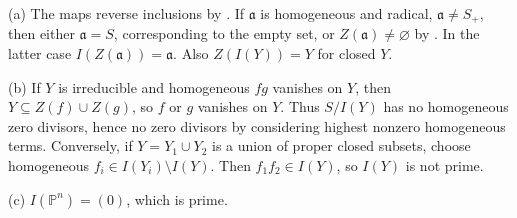 (a) The maps reverse inclusions by . If $\mathfrak a$ is homogeneous and radical, $\mathfrak a\ne S_+$, then either $\mathfrak a=S$, corresponding to the empty set, or $Z(\mathfrak a)\ne\varnothing$ by . In the latter case $I(Z(\mathfrak a))=\mathfrak a$. Also $Z(I(Y))=Y$ for closed $Y$.

(b) If $Y$ is irreducible and homogeneous $fg$ vanishes on $Y$, then $Y\subseteq Z(f)\cup Z(g)$, so $f$ or $g$ vanishes on $Y$. Thus $S/I(Y)$ has no homogeneous zero divisors, hence no zero divisors by considering highest nonzero homogeneous terms. Conversely, if $Y=Y_1\cup Y_2$ is a union of proper closed subsets, choose homogeneous $f_i\in I(Y_i)\setminus I(Y)$. Then $f_1f_2\in I(Y)$, so $I(Y)$ is not prime.

(c) $I(\mathbb P^n)=(0)$, which is prime.
